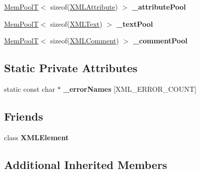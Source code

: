 \begin{DoxyCompactItemize}
\item 
\hypertarget{classtinyxml2_1_1_x_m_l_document_a0a57ebeba23bc6cfce88f12b4a946aac}{}\hyperlink{classtinyxml2_1_1_mem_pool_t}{Mem\+Pool\+T}$<$ sizeof(\hyperlink{classtinyxml2_1_1_x_m_l_attribute}{X\+M\+L\+Attribute}) $>$ {\bfseries \+\_\+attribute\+Pool}\label{classtinyxml2_1_1_x_m_l_document_a0a57ebeba23bc6cfce88f12b4a946aac}

\item 
\hypertarget{classtinyxml2_1_1_x_m_l_document_afe8ac410aaa53cf1f2142a4c2fd958c7}{}\hyperlink{classtinyxml2_1_1_mem_pool_t}{Mem\+Pool\+T}$<$ sizeof(\hyperlink{classtinyxml2_1_1_x_m_l_text}{X\+M\+L\+Text}) $>$ {\bfseries \+\_\+text\+Pool}\label{classtinyxml2_1_1_x_m_l_document_afe8ac410aaa53cf1f2142a4c2fd958c7}

\item 
\hypertarget{classtinyxml2_1_1_x_m_l_document_ac2e73ccbc037dee917c3163158180398}{}\hyperlink{classtinyxml2_1_1_mem_pool_t}{Mem\+Pool\+T}$<$ sizeof(\hyperlink{classtinyxml2_1_1_x_m_l_comment}{X\+M\+L\+Comment}) $>$ {\bfseries \+\_\+comment\+Pool}\label{classtinyxml2_1_1_x_m_l_document_ac2e73ccbc037dee917c3163158180398}

\end{DoxyCompactItemize}
\subsection*{Static Private Attributes}
\begin{DoxyCompactItemize}
\item 
\hypertarget{classtinyxml2_1_1_x_m_l_document_aaa8fd366adfb2c368ed7c13e471f54ae}{}static const char $\ast$ {\bfseries \+\_\+error\+Names} \mbox{[}X\+M\+L\+\_\+\+E\+R\+R\+O\+R\+\_\+\+C\+O\+U\+N\+T\mbox{]}\label{classtinyxml2_1_1_x_m_l_document_aaa8fd366adfb2c368ed7c13e471f54ae}

\end{DoxyCompactItemize}
\subsection*{Friends}
\begin{DoxyCompactItemize}
\item 
\hypertarget{classtinyxml2_1_1_x_m_l_document_ac2fba9b6e452829dd892f7392c24e0eb}{}class {\bfseries X\+M\+L\+Element}\label{classtinyxml2_1_1_x_m_l_document_ac2fba9b6e452829dd892f7392c24e0eb}

\end{DoxyCompactItemize}
\subsection*{Additional Inherited Members}



